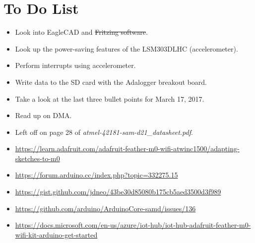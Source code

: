 \documentclass[12pt]{article}
\begin{document}
\section{To Do List}
\begin{itemize}
\item Look into EagleCAD and \sout{Fritzing software}.
\item Look up the power-saving features of the LSM303DLHC (accelerometer).
\item Perform interrupts using accelerometer.
\item Write data to the SD card with the Adalogger breakout board.
\item Take a look at the last three bullet points for March 17, 2017.
\item Read up on DMA.
\item Left off on page 28 of \textsl{atmel-42181-sam-d21\_datasheet.pdf}.
\item \url{https://learn.adafruit.com/adafruit-feather-m0-wifi-atwinc1500/adapting-sketches-to-m0}
\item \url{https://forum.arduino.cc/index.php?topic=332275.15}
\item \url{https://gist.github.com/jdneo/43be30d85080b175cb5aed3500d3f989}
\item \url{https://github.com/arduino/ArduinoCore-samd/issues/136}
\item \url{https://docs.microsoft.com/en-us/azure/iot-hub/iot-hub-adafruit-feather-m0-wifi-kit-arduino-get-started}
\end{itemize}
\end{document}
